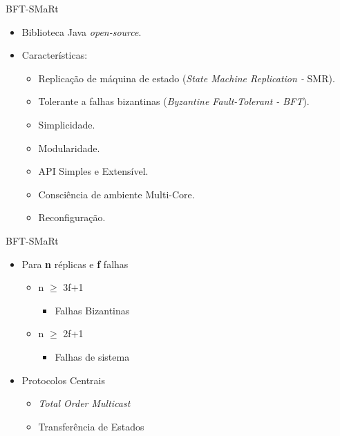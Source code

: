 \begin{frame}{}
\begin{columns}
		
	\end{columns}
\end{frame}

\begin{frame}{BFT-SMaRt}
	\begin{itemize}
		\item Biblioteca Java \textit{open-source}.
		\item Características:
		\begin{itemize}
			\item Replicação de máquina de estado (\textit{State Machine
				Replication - }SMR).
			\item Tolerante a falhas bizantinas (\textit{Byzantine Fault-Tolerant - BFT}).
			\item Simplicidade.
			\item Modularidade.
			\item API Simples e Extensível.
			\item Consciência de ambiente Multi-Core.	
			\item Reconfiguração.
		\end{itemize}
	\end{itemize}
\end{frame}

\begin{frame}{BFT-SMaRt}
	\begin{itemize}
		\item Para \textbf{n} réplicas e \textbf{f} falhas
		\begin{itemize}
			\item n $\geq$ 3f+1
			\begin{itemize}
				\item Falhas Bizantinas
			\end{itemize}
			\item n $\geq$ 2f+1
			\begin{itemize}
				\item Falhas de sistema
			\end{itemize}
		\end{itemize}
		\item Protocolos Centrais
		\begin{itemize}
			\item \textit{Total Order Multicast}	
			\item Transferência de Estados
		\end{itemize}
		
	\end{itemize}
\end{frame}


